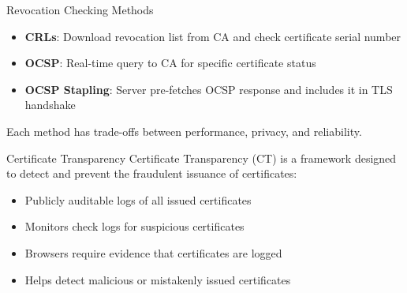 \begin{concept}{Revocation Checking Methods}
\begin{itemize}
    \item \textbf{CRLs}: Download revocation list from CA and check certificate serial number
    \item \textbf{OCSP}: Real-time query to CA for specific certificate status
    \item \textbf{OCSP Stapling}: Server pre-fetches OCSP response and includes it in TLS handshake
\end{itemize}
Each method has trade-offs between performance, privacy, and reliability.
\end{concept}





\begin{definition}{Certificate Transparency}
Certificate Transparency (CT) is a framework designed to detect and prevent the fraudulent issuance of certificates:
\begin{itemize}
    \item Publicly auditable logs of all issued certificates
    \item Monitors check logs for suspicious certificates
    \item Browsers require evidence that certificates are logged
    \item Helps detect malicious or mistakenly issued certificates
\end{itemize}
\end{definition}

\multend




